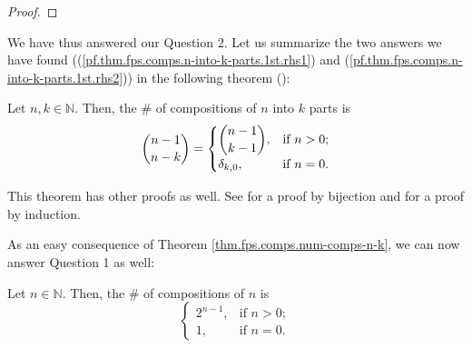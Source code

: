 \begin{proof}
\end{proof}

We have thus answered our Question 2. Let us summarize the two answers we have
found ((\ref{pf.thm.fps.comps.n-into-k-parts.1st.rhs1}) and
(\ref{pf.thm.fps.comps.n-into-k-parts.1st.rhs2})) in the following theorem
(\cite[Theorem 2.10.1]{19fco}):

\begin{theorem}
\label{thm.fps.comps.num-comps-n-k}Let $n,k\in\mathbb{N}$. Then, the \# of
compositions of $n$ into $k$ parts is%
\[
\dbinom{n-1}{n-k}=%
\begin{cases}
\dbinom{n-1}{k-1}, & \text{if }n>0;\\
\delta_{k,0}, & \text{if }n=0.
\end{cases}
\]

\end{theorem}

This theorem has other proofs as well. See \cite[Proof of Theorem
2.10.1]{19fco} for a proof by bijection and \cite[solution to Exercise
2.10.2]{19fco} for a proof by induction.

As an easy consequence of Theorem \ref{thm.fps.comps.num-comps-n-k}, we can
now answer Question 1 as well:

\begin{theorem}
\label{thm.fps.comps.num-comps-n}Let $n\in\mathbb{N}$. Then, the \# of
compositions of $n$ is%
\[%
\begin{cases}
2^{n-1}, & \text{if }n>0;\\
1, & \text{if }n=0.
\end{cases}
\]

\end{theorem}


